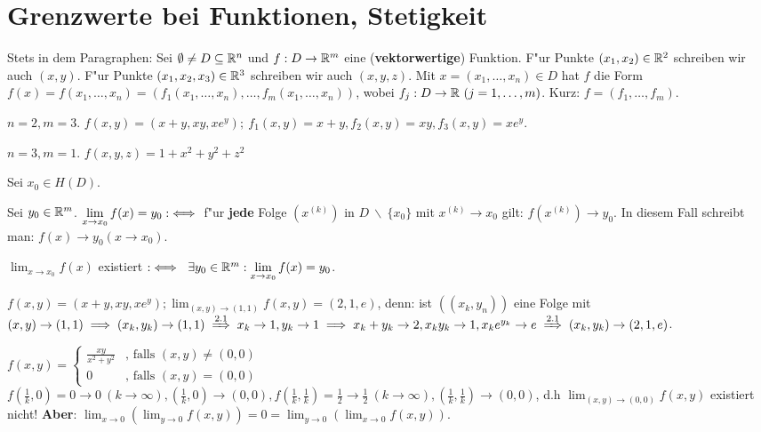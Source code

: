 \documentclass[a4paper,twoside,DIV15,BCOR12mm]{scrbook}
\begin{document}
\chapter{Grenzwerte bei Funktionen, Stetigkeit}

\begin{vereinbarung}
Stets in dem Paragraphen: Sei $\emptyset \ne D \subseteq \mathbb{R}^n$ und $f: D\to\mathbb{R}^m$ eine (\textbf{vektorwertige}) Funktion. F"ur Punkte $(x_1, x_2) \in \mathbb{R}^2$ schreiben wir auch $(x,y)$. F"ur Punkte $(x_1, x_2, x_3) \in\mathbb{R}^3$ schreiben wir auch $(x, y, z)$. Mit $x=(x_1,\ldots,x_n)\in D$ hat $f$ die Form $f(x)=f(x_1,\ldots,x_n)=(f_1(x_1,\ldots,x_n),\ldots,f_m(x_1,\ldots,x_n))$, wobei $f_j:D\to\mathbb{R}\ (j=1,\ldots,m)$. Kurz: $f=(f_1,\ldots,f_m)$.
\end{vereinbarung}

\begin{beispiele}
\item $n=2,m=3$. $f(x,y)=(x+y,xy,xe^y);\ f_1(x,y)=x+y, f_2(x,y)=xy, f_3(x,y)=xe^y$.
\item $n=3,m=1$. $f(x,y,z)=1+x^2+y^2+z^2$
\end{beispiele}

\begin{definition*}
Sei $x_0\in H(D)$.

\begin{liste}
\item Sei $y_0 \in \mathbb{R}^m$. $\displaystyle\lim_{x\to x_0}f(x)=y_0 :\iff$ f"ur \textbf{jede} Folge $(x^{(k)})$ in $D\ \backslash\ \{x_0\}$ mit $x^{(k)}\to x_0$ gilt: $f(x^{(k)})\to y_0$. In diesem Fall schreibt man: $f(x)\to y_0(x\to x_0)$.
\item $\displaystyle\lim_{x\to x_0}f(x)$ existiert $:\iff\ \exists y_0 \in \mathbb{R}^m: \displaystyle\lim_{x\to x_0}f(x)=y_0$.
\end{liste}
\end{definition*}

\begin{beispiele}
\item $f(x,y)=(x+y,xy,xe^y); \displaystyle\lim_{(x,y)\to(1,1)}f(x,y)=(2,1,e)$, denn: ist $((x_k, y_n))$ eine Folge mit $(x,y)\to(1,1)\folgt (x_k,y_k)\to(1,1)\folgtnach{2.1}x_k\to 1, y_k\to 1 \folgt x_k+y_k\to 2, x_ky_k\to 1, x_ke^{y_k}\to e\folgtnach{2.1}(x_k,y_k)\to(2,1,e)$.
\item $f(x,y)=\begin{cases}
\frac{xy}{x^2+y^2}&\text{, falls }(x,y)\ne(0,0)\\
0&\text{, falls }(x,y)=(0,0)
\end{cases}$\\
$f(\frac{1}{k},0)=0\to 0\ (k\to \infty), (\frac{1}{k},0)\to(0,0), f(\frac{1}{k},\frac{1}{k})=\frac{1}{2}\to\frac{1}{2}\ (k\to \infty), (\frac{1}{k},\frac{1}{k})\to(0,0)$, d.h $\displaystyle\lim_{(x,y)\to(0,0)}f(x,y)$ existiert nicht! \textbf{Aber}: $\displaystyle\lim_{x\to 0}(\displaystyle\lim_{y\to 0} f(x,y))=0=\displaystyle\lim_{y\to 0}(\displaystyle\lim_{x\to 0} f(x,y))$.
\end{beispiele}
\end{document}
